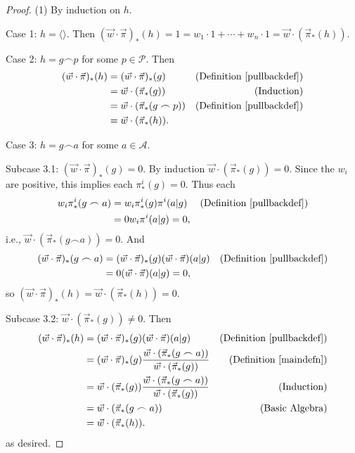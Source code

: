 \documentclass[runningheads]{llncs}
\begin{document}
\begin{proof}
    (1) By induction on $h$.

    Case 1: $h=\langle\rangle$. Then
    $(\vec w\cdot\vec\pi)_*(h)=1=w_1\cdot 1+\cdots+w_n\cdot 1
    =\vec w\cdot (\vec\pi_*(h))$.

    Case 2: $h=g\frown p$ for some $p\in\mathcal P$. Then
    \begin{align*}
        (\vec w\cdot \vec\pi)_*(h)
            &= (\vec w\cdot\vec\pi)_*(g)
                &\mbox{(Definition \ref{pullbackdef})}\\
            &= \vec w\cdot(\vec\pi_*(g))
                &\mbox{(Induction)}\\
            &= \vec w\cdot(\vec\pi_*(g\frown p))
                &\mbox{(Definition \ref{pullbackdef})}\\
            &= \vec w\cdot(\vec\pi_*(h)).
    \end{align*}

    Case 3: $h=g\frown a$ for some $a\in\mathcal A$.

    Subcase 3.1: $(\vec w\cdot \vec\pi)_*(g)=0$.
        By induction $\vec w\cdot(\vec\pi_*(g))=0$.
        Since the $w_i$ are positive, this implies
        each $\pi^i_*(g)=0$.
        Thus each
        \begin{align*}
            w_i\pi^i_*(g\frown a)
                &= w_i\pi^i_*(g)\pi^i(a|g)
                    &\mbox{(Definition \ref{pullbackdef})}\\
                &= 0w_i\pi^i(a|g)=0,
        \end{align*}
        i.e., $\vec w\cdot(\vec\pi_*(g\frown a))=0$.
        And
        \begin{align*}
            (\vec w\cdot\vec\pi)_*(g\frown a)
                &= (\vec w\cdot\vec\pi)_*(g)(\vec w\cdot\vec\pi)(a|g)
                    &\mbox{(Definition \ref{pullbackdef})}\\
                &= 0(\vec w\cdot\vec\pi)(a|g) = 0,
        \end{align*}
        so $(\vec w\cdot\vec\pi)_*(h)=\vec w\cdot(\vec \pi_*(h))=0$.

    Subcase 3.2: $\vec w\cdot (\vec\pi_*(g))\not=0$. Then
    \begin{align*}
        (\vec w\cdot\vec\pi)_*(h)
            &= (\vec w\cdot\vec\pi)_*(g)(\vec w\cdot\vec\pi)(a|g)
                &\mbox{(Definition \ref{pullbackdef})}\\
            &= (\vec w\cdot\vec\pi)_*(g)
                \frac
                {\vec w\cdot(\vec\pi_*(g\frown a))}
                {\vec w\cdot(\vec\pi_*(g))}
                &\mbox{(Definition \ref{maindefn})}\\
            &= \vec w\cdot(\vec\pi_*(g))
                \frac
                {\vec w\cdot(\vec\pi_*(g\frown a))}
                {\vec w\cdot(\vec\pi_*(g))}
                &\mbox{(Induction)}\\
            &= \vec w\cdot(\vec\pi_*(g\frown a))
                &\mbox{(Basic Algebra)}\\
            &= \vec w\cdot(\vec\pi_*(h)).
    \end{align*}
    as desired.


\end{proof}
\end{document}
